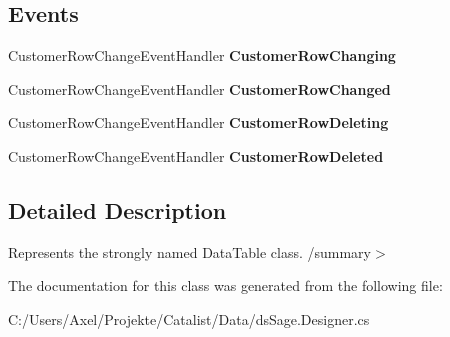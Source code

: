 \subsection*{Events}
\begin{DoxyCompactItemize}
\item 
Customer\+Row\+Change\+Event\+Handler {\bfseries Customer\+Row\+Changing}\hypertarget{class_products_1_1_data_1_1ds_sage_1_1_customer_data_table_a0b16101c47eb4cc97ea948af5fafe988}{}\label{class_products_1_1_data_1_1ds_sage_1_1_customer_data_table_a0b16101c47eb4cc97ea948af5fafe988}

\item 
Customer\+Row\+Change\+Event\+Handler {\bfseries Customer\+Row\+Changed}\hypertarget{class_products_1_1_data_1_1ds_sage_1_1_customer_data_table_a659f1cc452264f0f08d658766db1ca58}{}\label{class_products_1_1_data_1_1ds_sage_1_1_customer_data_table_a659f1cc452264f0f08d658766db1ca58}

\item 
Customer\+Row\+Change\+Event\+Handler {\bfseries Customer\+Row\+Deleting}\hypertarget{class_products_1_1_data_1_1ds_sage_1_1_customer_data_table_aadacfd3c6a46c246bd33a2d081352e81}{}\label{class_products_1_1_data_1_1ds_sage_1_1_customer_data_table_aadacfd3c6a46c246bd33a2d081352e81}

\item 
Customer\+Row\+Change\+Event\+Handler {\bfseries Customer\+Row\+Deleted}\hypertarget{class_products_1_1_data_1_1ds_sage_1_1_customer_data_table_ab62cd9adf383a02bacbe5ff9bd4dae16}{}\label{class_products_1_1_data_1_1ds_sage_1_1_customer_data_table_ab62cd9adf383a02bacbe5ff9bd4dae16}

\end{DoxyCompactItemize}


\subsection{Detailed Description}
Represents the strongly named Data\+Table class. /summary$>$ 

The documentation for this class was generated from the following file\+:\begin{DoxyCompactItemize}
\item 
C\+:/\+Users/\+Axel/\+Projekte/\+Catalist/\+Data/ds\+Sage.\+Designer.\+cs\end{DoxyCompactItemize}

